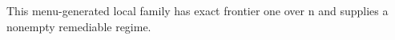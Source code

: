 This menu-generated local family has exact frontier one over n and supplies a nonempty remediable regime.
